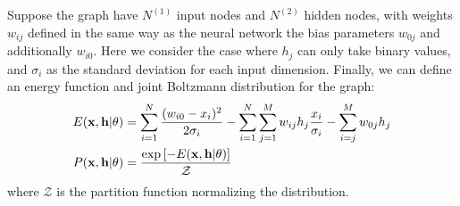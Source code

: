 Suppose the graph have $N^{(1)}$ input nodes 
and $N^{(2)}$ hidden nodes,
with weights $w_{ij}$ defined in the same way as the neural network
the bias parameters $w_{0j}$ and additionally $w_{i0}$.
Here we consider the case where $h_j$ can only take binary values,
and $\sigma_i$ as the standard deviation for each input dimension.
Finally, we can define an energy function and 
joint Boltzmann distribution for the graph:
%
\begin{equation}
\begin{aligned}
    E(\mathbf{x},\mathbf{h}|\theta) &= 
        \sum_{i=1}^N \frac{(w_{i0} - x_i)^2}{2 \sigma_i}
        - \sum_{i=1}^N \sum_{j=1}^M
             w_{ij} h_j \frac{x_i}{\sigma_i}
        - \sum_{i=j}^M w_{0j} h_j \\
    P(\mathbf{x},\mathbf{h}|\theta) &= 
        \frac{\exp\left[-E(\mathbf{x},\mathbf{h}|\theta)\right]}
        {\mathcal{Z}}
\end{aligned}
\end{equation}
%
where $\mathcal{Z}$ is the partition function normalizing 
the distribution.






























